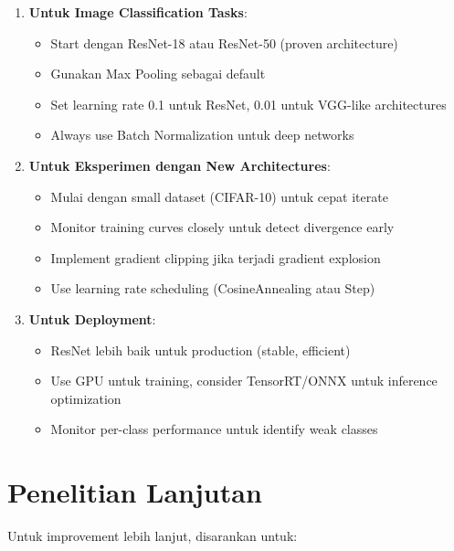 \documentclass[12pt,a4paper]{report}
\begin{document}
\begin{enumerate}
    \item \textbf{Untuk Image Classification Tasks}:
    \begin{itemize}
        \item Start dengan ResNet-18 atau ResNet-50 (proven architecture)
        \item Gunakan Max Pooling sebagai default
        \item Set learning rate 0.1 untuk ResNet, 0.01 untuk VGG-like architectures
        \item Always use Batch Normalization untuk deep networks
    \end{itemize}
    
    \item \textbf{Untuk Eksperimen dengan New Architectures}:
    \begin{itemize}
        \item Mulai dengan small dataset (CIFAR-10) untuk cepat iterate
        \item Monitor training curves closely untuk detect divergence early
        \item Implement gradient clipping jika terjadi gradient explosion
        \item Use learning rate scheduling (CosineAnnealing atau Step)
    \end{itemize}
    
    \item \textbf{Untuk Deployment}:
    \begin{itemize}
        \item ResNet lebih baik untuk production (stable, efficient)
        \item Use GPU untuk training, consider TensorRT/ONNX untuk inference optimization
        \item Monitor per-class performance untuk identify weak classes
    \end{itemize}
\end{enumerate}

\section{Penelitian Lanjutan}

Untuk improvement lebih lanjut, disarankan untuk:
\end{document}
